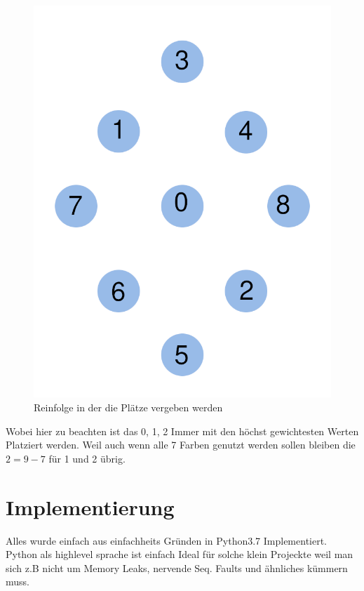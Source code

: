 \documentclass{article}
\begin{document}
\begin{figure}[h]
	\centering
	\includegraphics{priority_places}
	\caption{Reinfolge in der die Plätze vergeben werden}
\end{figure}


\newpage

Wobei hier zu beachten ist das 0, 1, 2 Immer mit den höchst gewichtesten Werten Platziert werden. Weil auch wenn alle 7 Farben genutzt werden sollen bleiben die \( 2 = 9 - 7\) für 1 und 2 übrig.

\section{Implementierung}

Alles wurde einfach aus einfachheits Gründen in Python3.7 Implementiert. Python als highlevel sprache ist einfach Ideal für solche klein Projeckte weil man sich z.B nicht um Memory Leaks, nervende Seq. Faults und ähnliches kümmern muss.
\end{document}
